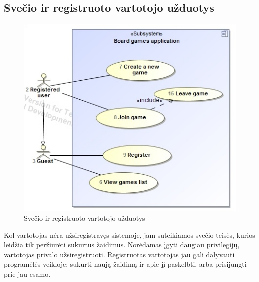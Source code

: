 \documentclass{VUMIFPSkursinis}
\begin{document}
	\subsection{Svečio ir registruoto vartotojo užduotys}
		\begin{figure}[H]
			\centering
			\includegraphics[scale=0.6]{img/UzduociuDiagrama1}
			\caption{Svečio ir registruoto vartotojo užduotys}
			\label{img:UzduociuDiagrama1}
		\end{figure}
		Kol vartotojas nėra užsiregistravęs sistemoje, jam suteikiamos svečio teisės, kurios leidžia tik peržiūrėti sukurtus žaidimus. Norėdamas įgyti daugiau privilegijų, vartotojas privalo užsiregistruoti. Registruotas vartotojas jau gali dalyvauti programėlės veikloje: sukurti naują žaidimą ir apie jį paskelbti, arba prisijungti prie jau esamo.
\end{document}
